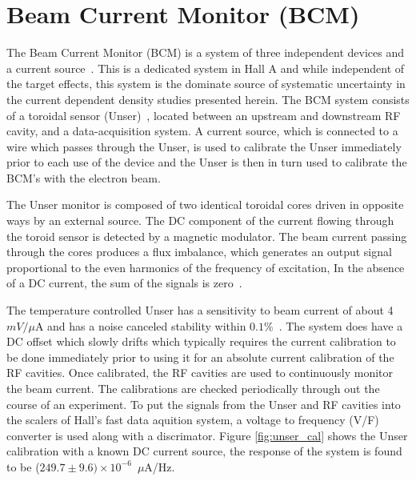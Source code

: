 \documentclass[review,numbers,sort&compress]{elsarticle}
\begin{document}
\section{Beam Current Monitor (BCM)}
\label{BCM}

The Beam Current Monitor (BCM) is a system of three independent devices and a current source~\cite{Denard:2001zg}. 
This is a dedicated system in Hall A and while independent of the target effects, this system
is the dominate source of systematic uncertainty in the current dependent density studies presented
herein.  The BCM system consists of a toroidal sensor (Unser)~\cite{Unser:1991dr}, located between 
an upstream and downstream RF cavity, and a data-acquisition system.  A current source, which is connected to a wire which 
passes through the Unser, is used to calibrate the Unser immediately prior to each use of the device and
the Unser is then in turn used to calibrate the BCM's with the electron beam. 

The Unser monitor is composed of two identical toroidal cores driven in opposite ways by an external source.  
The DC component of the current flowing through the toroid sensor is detected by a magnetic modulator. The 
beam current passing through the cores produces a flux imbalance, which generates an output signal proportional to the 
even harmonics of the frequency of excitation, In the absence of a DC current, the sum of the signals is zero~\cite{Denard:2001zg}. 

The temperature controlled Unser has a sensitivity to beam current of about 4~$mV/\mu$A and has a noise canceled 
stability within $0.1\%$~\cite{Denard:2001zg}.  The system does have a DC offset which slowly drifts which typically 
requires the current calibration to be done immediately prior to using it for an absolute current calibration
of the RF cavities.  Once calibrated, the RF cavities are used to continuously monitor the beam current. 
The calibrations are checked periodically through out the course of an experiment. 
To put the signals from the Unser and RF cavities into the scalers of Hall's fast data aquition system,
a voltage to frequency (V/F) converter is used along with a discrimator. 
Figure \ref{fig:unser_cal} shows the Unser calibration with a known DC current source, 
the response of the system is found to be ($249.7 \pm 9.6) \times 10^{-6}$~$\mu$A/Hz. 
\end{document}
